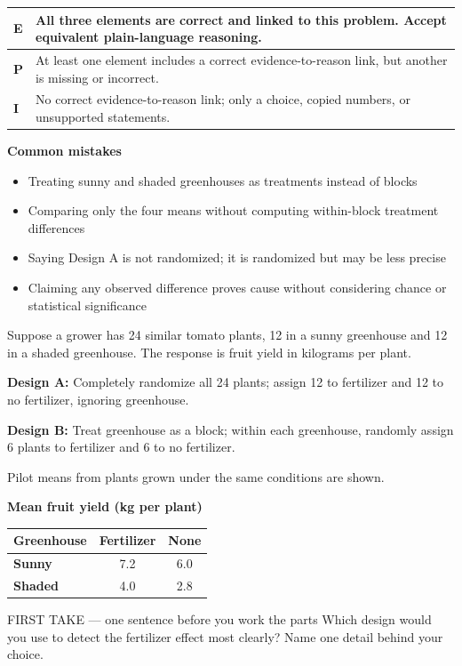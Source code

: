 \documentclass[11pt]{article}
\begin{document}
{\small\renewcommand{\arraystretch}{1.25}
\noindent\begin{tabular}{|p{0.5in}|p{5.9in}|}
\hline
\textbf{E} & All three elements are correct and linked to this problem. Accept equivalent plain-language reasoning. \\ \hline
\textbf{P} & At least one element includes a correct evidence-to-reason link, but another is missing or incorrect. \\ \hline
\textbf{I} & No correct evidence-to-reason link; only a choice, copied numbers, or unsupported statements. \\ \hline
\end{tabular}}

\textbf{Common mistakes}
\begin{itemize}[leftmargin=1.5em,itemsep=2pt,topsep=2pt]
  \item Treating sunny and shaded greenhouses as treatments instead of blocks
  \item Comparing only the four means without computing within-block treatment differences
  \item Saying Design A is not randomized; it is randomized but may be less precise
  \item Claiming any observed difference proves cause without considering chance or statistical significance
\end{itemize}

\clearpage
{}

Suppose a grower has 24 similar tomato plants, 12 in a sunny greenhouse and 12 in a shaded greenhouse. The response is fruit yield in kilograms per plant.\par\smallskip \textbf{Design A:} Completely randomize all 24 plants; assign 12 to fertilizer and 12 to no fertilizer, ignoring greenhouse.\par \textbf{Design B:} Treat greenhouse as a block; within each greenhouse, randomly assign 6 plants to fertilizer and 6 to no fertilizer.\par\smallskip Pilot means from plants grown under the same conditions are shown.\par
\begin{center}
\textbf{Mean fruit yield (kg per plant)}\par\smallskip
\begin{tabular}{|l|c|c|}
\hline
\textbf{Greenhouse} & \textbf{Fertilizer} & \textbf{None} \\ \hline
\textbf{Sunny} & 7.2 & 6.0 \\ \hline
\textbf{Shaded} & 4.0 & 2.8 \\ \hline
\end{tabular}
\end{center}
\begin{firsttakebox}{FIRST TAKE --- one sentence before you work the parts}
Which design would you use to detect the fertilizer effect most clearly? Name one detail behind your choice.\par
{}
\end{firsttakebox}
\end{document}
